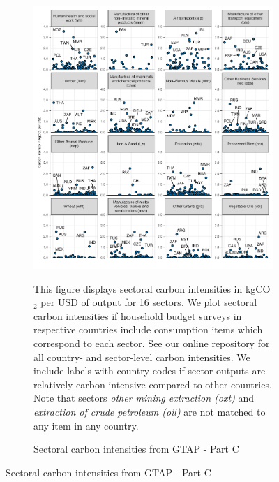 \begin{figure}[ht!]\ContinuedFloat
\begin{subfigure}[b]{\textwidth}
  \centering
  \caption{Sectoral carbon intensities from GTAP - Part C} \label{fig:B3}  \includegraphics{Analysis_Carbon_Intensities_GTAP/Figure_2.1.1_C_2017B}
  \begin{subcaption2}
    This figure displays sectoral carbon intensities in kgCO$_{2}$ per USD of output for 16 sectors. We plot sectoral carbon intensities if household budget surveys in respective countries include consumption items which correspond to each sector. See our online repository for all country- and sector-level carbon intensities. We include labels with country codes if sector outputs are relatively carbon-intensive compared to other countries. Note that sectors \textit{other mining extraction (oxt)} and \textit{extraction of crude petroleum (oil)} are not matched to any item in any country.
  \end{subcaption2}
\end{subfigure}
\end{figure}

\clearpage


